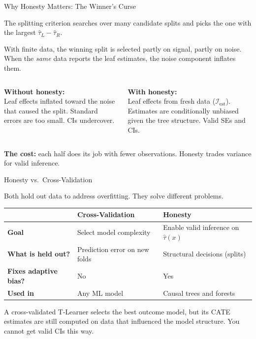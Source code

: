 \documentclass[aspectratio=169, 11pt, handout]{beamer}
\begin{document}
\begin{frame}{Why Honesty Matters: The Winner's Curse}
 
The splitting criterion searches over many candidate splits and picks the one with the largest $\hat{\tau}_L - \hat{\tau}_R$.
 
\pause
\bigskip
 
With finite data, the winning split is selected partly on signal, partly on noise. When the \emph{same} data reports the leaf estimates, the noise component inflates them.
 
\pause
\bigskip
 
\begin{columns}
\textbf{Without honesty:}\\
Leaf effects inflated toward the noise that caused the split. Standard errors are too small. CIs undercover.
 
\textbf{With honesty:}\\
Leaf effects from fresh data ($\mathcal{I}_{\text{est}}$). Estimates are conditionally unbiased given the tree structure. Valid SEs and CIs.
\end{columns}
 
\pause
\bigskip
 
\textbf{The cost:} each half does its job with fewer observations. Honesty trades variance for valid inference.
 
\end{frame}
 
\begin{frame}{Honesty vs.\ Cross-Validation}
 
Both hold out data to address overfitting. They solve different problems.
 
\bigskip
 
\begin{center}
\begin{tabular}{p{4.0cm}p{4.0cm}p{4.0cm}}
\toprule
& \textbf{Cross-Validation} & \textbf{Honesty} \\
\midrule
\textbf{Goal} & Select model complexity & Enable valid inference on $\hat{\tau}(x)$ \\[0.4em]
\textbf{What is held out?} & Prediction error on new folds & Structural decisions (splits) \\[0.4em]
\textbf{Fixes adaptive bias?} & \textcolor{warnred}{No} & \textcolor{sbgreen}{Yes} \\[0.4em]
\textbf{Used in} & Any ML model & Causal trees and forests \\
\bottomrule
\end{tabular}
\end{center}
 
\bigskip
 
A cross-validated T-Learner selects the best outcome model, but its CATE estimates are still computed on data that influenced the model structure. You cannot get valid CIs this way.
 
\end{frame}
 
\end{document}
